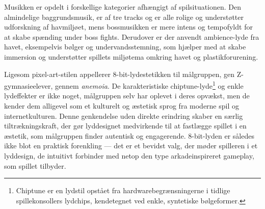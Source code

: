 Musikken er opdelt i forskellige kategorier afhængigt af spilsituationen. Den almindelige baggrundsmusik, er af tre tracks og er alle rolige og understøtter udforskning af havmiljøet, mens bossmusikken er mere intens og tempofyldt for at skabe spænding under boss fights. Derudover er der anvendt ambience-lyde fra havet, eksempelvis bølger og undervandsstemning, som hjælper med at skabe immersion og understøtter spillets miljøtema omkring havet og plastikforurening.

Ligesom pixel-art-stilen appellerer 8-bit-lydestetikken til målgruppen, gen Z-gymnasieelever, gennem \textit{anemoia}. De karakteristiske chiptune-lyde\footnote{Chiptune er en lydstil opstået fra  hardwarebegrænsningerne i tidlige spillekonsollers lydchips, kendetegnet ved  enkle, syntetiske bølgeformer.} og enkle lydeffekter er ikke noget, målgruppen selv har oplevet i deres opvækst, men de kender dem alligevel som et kulturelt og æstetisk sprog fra moderne spil og internetkulturen. Denne genkendelse uden direkte erindring skaber en særlig tiltrækningskraft, der gør lyddesignet medvirkende til at fastlægge spillet i en æstetik, som målgruppen finder autentisk og engagerende. 8-bit-lyden er således ikke blot en praktisk forenkling — det er et bevidst valg, der møder spilleren i et lyddesign, de intuitivt forbinder med netop den type arkadeinspireret gameplay, som spillet tilbyder.
